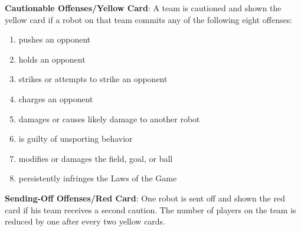 \documentclass[12pt]{hurocup}
\begin{document}
\begin{lawlist}[US]

\item \textbf{Cautionable Offenses/Yellow Card}: A team is cautioned
  and shown the yellow card if a robot on that team commits any of the
  following eight offenses:
  \begin{enumerate}
    \item pushes an opponent
    \item holds an opponent
    \item strikes or attempts to strike an opponent
    \item charges an opponent
    \item damages or causes likely damage to another robot
    \item is guilty of unsporting behavior
    \item modifies or damages the field, goal, or ball
    \item persistently infringes the Laws of the Game
  \end{enumerate}

\item \textbf{Sending-Off Offenses/Red Card}: One robot is sent off
  and shown the red card if his team receives a second caution. The
  number of players on the team is reduced by one after every two
  yellow cards.

\end{lawlist}

\end{document}
